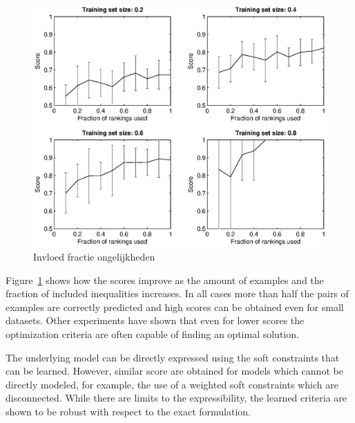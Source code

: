 \documentclass{llncs}
\begin{document}
\begin{figure}

  \centering
    \includegraphics[width=1\linewidth]{rankings}
  \caption{Invloed fractie ongelijkheden}
  \label{fig:fractie}

\end{figure}

Figure~\ref{fig:fractie} shows how the scores improve as the amount of examples and the fraction of included inequalities increases.
In all cases more than half the pairs of examples are correctly predicted and high scores can be obtained even for small datasets.
Other experiments have shown that even for lower scores the optimization criteria are often capable of finding an optimal solution.

The underlying model can be directly expressed using the soft constraints that can be learned.
However, similar score are obtained for models which cannot be directly modeled, for example, the use of a weighted soft constraints which are disconnected.
While there are limits to the expressibility, the learned criteria are shown to be robust with respect to the exact formulation.
\end{document}

